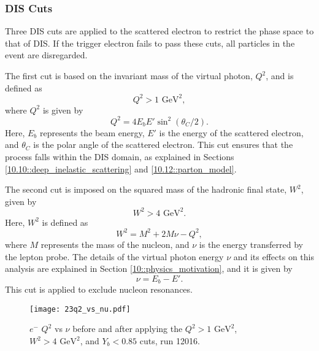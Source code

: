 \subsubsection{DIS Cuts}
\label{13.23::dis_cuts}
    Three DIS cuts are applied to the scattered electron to restrict the phase space to that of DIS.
    If the trigger electron fails to pass these cuts, all particles in the event are disregarded.

    The first cut is based on the invariant mass of the virtual photon, $Q^2$, and is defined as
    \begin{equation*}
        Q^2 > 1 \text{ GeV}^2,
    \end{equation*}
    where $Q^2$ is given by
    \begin{equation}
        Q^2 = 4E_bE'\sin^2(\theta_C/2).
        \label{eq::13.23::q2}
    \end{equation}
    Here, $E_b$ represents the beam energy, $E'$ is the energy of the scattered electron, and $\theta_C$ is the polar angle of the scattered electron.
    This cut ensures that the process falls within the DIS domain, as explained in Sections \ref{10.10::deep_inelastic_scattering} and \ref{10.12::parton_model}.

    The second cut is imposed on the squared mass of the hadronic final state, $W^2$, given by
    \begin{equation*}
        W^2 > 4 \text{ GeV}^2.
    \end{equation*}
    Here, $W^2$ is defined as
    \begin{equation*}
        W^2 = M^2 + 2M\nu - Q^2,
    \end{equation*}
    where $M$ represents the mass of the nucleon, and $\nu$ is the energy transferred by the lepton probe.
    The details of the virtual photon energy $\nu$ and its effects on this analysis are explained in Section \ref{10::physics_motivation}, and it is given by
    \begin{equation}
        \nu = E_b - E'.
        \label{eq::13.23::nu}
    \end{equation}
    This cut is applied to exclude nucleon resonances.

    \begin{figure}[b!]
        \texttt{[image: 23q2\_vs\_nu.pdf]}
        \caption[$Q^2$ vs $\nu$ comparison]
        {$e^-$ $Q^2$ vs $\nu$ before and after applying the $Q^2 > 1 \text{ GeV}^2$, $W^2 > 4 \text{ GeV}^2$, and $Y_b < 0.85$ cuts, run 12016.}
        \label{fig::13.23::q2_vs_nu}
    \end{figure}

